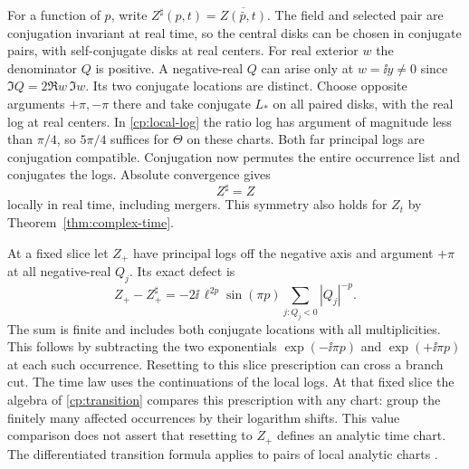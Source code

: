 For a function of \(p\), write
\(Z^\sharp(p,t)=\overline{Z(\bar p,t)}\). The field and selected
pair are conjugation invariant at real time, so the central disks
can be chosen in conjugate pairs, with self-conjugate disks at
real centers. For real exterior \(w\) the denominator \(Q\) is
positive. A negative-real \(Q\) can arise only at \(w=\ii y\ne0\)
since \(\Im Q=2\Re w\,\Im w\). Its two conjugate locations are
distinct. Choose opposite arguments \(+\pi,-\pi\) there and take
conjugate \(L_*\) on all paired disks, with the real log at real
centers. In \eqref{cp:local-log} the ratio log has argument of
magnitude less than \(\pi/4\), so \(5\pi/4\) suffices for \(\Theta\)
on these charts. Both far principal logs are conjugation
compatible. Conjugation now permutes the entire occurrence
list and conjugates the logs. Absolute convergence gives
\begin{equation}
 Z^\sharp=Z
 \label{cp:schwarz}
\end{equation}
locally in real time, including mergers. This symmetry also holds
for \(Z_t\) by Theorem~\ref{thm:complex-time}.

At a fixed slice let \(Z_+\) have principal logs off the negative
axis and argument \(+\pi\) at all negative-real \(Q_j\). Its exact
defect is
\begin{equation}
 Z_+-Z_+^\sharp=-2\ii\,\ell^{2p}\sin(\pi p)
                        \sum_{j:Q_j<0}|Q_j|^{-p}.
 \label{cp:axis-defect}
\end{equation}
The sum is finite and includes both conjugate locations with
all multiplicities. This follows by subtracting the two
exponentials \(\exp(-\ii\pi p)\) and \(\exp(+\ii\pi p)\) at each
such occurrence. Resetting to this slice prescription can cross
a branch cut. The time law uses the continuations of the local logs.
At that fixed slice the algebra of \eqref{cp:transition} compares this
prescription with any chart: group the finitely many affected occurrences
by their logarithm shifts. This value comparison does not assert that
resetting to $Z_+$ defines an analytic time chart. The differentiated
transition formula applies to pairs of local analytic charts
\cite{BakerCM04,BakerCMReview}.

